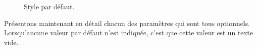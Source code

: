 \documentclass[12pt,a4paper]{scrartcl}
\theoremstyle{definition}
\begin{document}
\begin{figure}[!tbp]
  \setlength{\fboxrule}{1.5pt}
  \centering
  \hfill
  \caption{Style par défaut.}
  \label{style:default}
\end{figure}

Présentons maintenant en détail chacun des paramètres qui sont tous optionnels. Lorsqu'aucune valeur par défaut n'est indiquée, c'est que cette valeur est un texte vide.
\end{document}
